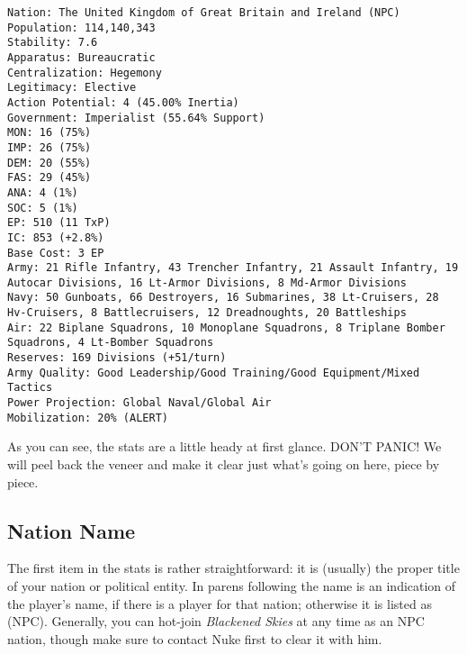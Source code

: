 \documentclass[11 pt]{scrartcl}
\begin{document}
\texttt{Nation: The United Kingdom of Great Britain and Ireland (NPC)\\
Population: 114,140,343\\
Stability: 7.6\\
Apparatus: Bureaucratic\\
Centralization: Hegemony\\
Legitimacy: Elective\\
Action Potential: 4 (45.00\% Inertia)\\
Government: Imperialist (55.64\% Support)\\
MON: 16 (75\%) \\
IMP: 26 (75\%) \\
DEM: 20 (55\%) \\
FAS: 29 (45\%) \\
ANA: 4 (1\%) \\
SOC: 5 (1\%) \\
EP: 510 (11 TxP)\\
IC: 853 (+2.8\%)\\
Base Cost: 3 EP\\
Army: 21 Rifle Infantry, 43 Trencher Infantry, 21 Assault Infantry, 19 Autocar Divisions, 16 Lt-Armor Divisions, 8 Md-Armor Divisions\\
Navy: 50 Gunboats, 66 Destroyers, 16 Submarines, 38 Lt-Cruisers, 28 Hv-Cruisers, 8 Battlecruisers, 12 Dreadnoughts, 20 Battleships\\
Air: 22 Biplane Squadrons, 10 Monoplane Squadrons, 8 Triplane Bomber Squadrons, 4 Lt-Bomber Squadrons\\
Reserves: 169 Divisions (+51/turn)\\
Army Quality: Good Leadership/Good Training/Good Equipment/Mixed Tactics\\
Power Projection: Global Naval/Global Air\\
Mobilization: 20\% (ALERT)\\}

As you can see, the stats are a little heady at first glance. DON'T PANIC! We will peel back the veneer and make it clear just what's going on here, piece by piece.

\subsection{Nation Name}

The first item in the stats is rather straightforward: it is (usually) the proper title of your nation or political entity. In parens following the name is an indication of the player's name, if there is a player for that nation; otherwise it is listed as (NPC). Generally, you can hot-join \textsl{Blackened Skies} at any time as an NPC nation, though make sure to contact Nuke first to clear it with him.
\end{document}

